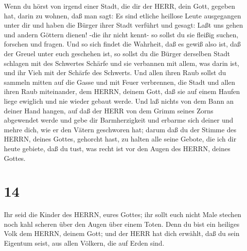  Wenn du hörst von irgend einer Stadt, die dir der HERR,
dein Gott, gegeben hat, darin zu wohnen, daß man sagt:  Es
sind etliche heillose Leute ausgegangen unter dir und haben die Bürger
ihrer Stadt verführt und gesagt: Laßt uns gehen und andern Göttern
dienen! -die ihr nicht kennt-  so sollst du sie fleißig
suchen, forschen und fragen. Und so sich findet die Wahrheit, daß es
gewiß also ist, daß der Greuel unter euch geschehen ist, 
so sollst du die Bürger derselben Stadt schlagen mit des Schwertes
Schärfe und sie verbannen mit allem, was darin ist, und ihr Vieh mit der
Schärfe des Schwerts.  Und allen ihren Raub sollst du
sammeln mitten auf die Gasse und mit Feuer verbrennen, die Stadt und
allen ihren Raub miteinander, dem HERRN, deinem Gott, daß sie auf einem
Haufen liege ewiglich und nie wieder gebaut werde.  Und laß
nichts von dem Bann an deiner Hand hangen, auf daß der HERR von dem
Grimm seines Zorns abgewendet werde und gebe dir Barmherzigkeit und
erbarme sich deiner und mehre dich, wie er den Vätern geschworen hat;
 darum daß du der Stimme des HERRN, deines Gottes, gehorcht
hast, zu halten alle seine Gebote, die ich dir heute gebiete, daß du
tust, was recht ist vor den Augen des HERRN, deines Gottes.

\hypertarget{section-13}{%
\section{14}\label{section-13}}

 Ihr seid die Kinder des HERRN, eures Gottes; ihr sollt euch
nicht Male stechen noch kahl scheren über den Augen über einem Toten.
 Denn du bist ein heiliges Volk dem HERRN, deinem Gott; und
der HERR hat dich erwählt, daß du sein Eigentum seist, aus allen
Völkern, die auf Erden sind.

